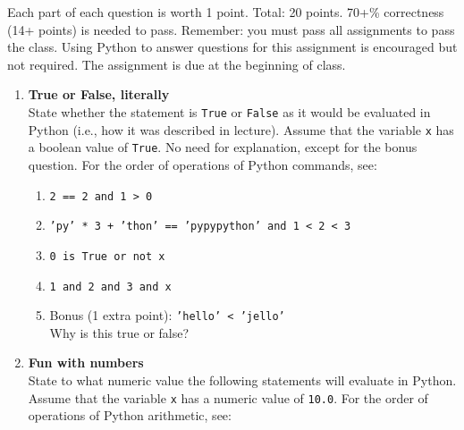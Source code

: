 \documentclass{article}
\newcounter{points}
\begin{document}
\pagestyle{fancy}

Each part of each question is worth 1 point.  Total: 20 points.  70+\% correctness (14+ points) is needed to pass.  Remember: you must pass all assignments to pass the class.  Using Python to answer questions for this assignment is encouraged but not required.  The assignment is due at the beginning of class.

\begin{enumerate}
\item \textbf{True or False, literally} \\
State whether the statement is \texttt{True} or \texttt{False} as it would be evaluated in Python (i.e., how it was described in lecture).  Assume that the variable \texttt{x} has a boolean value of \texttt{True}.  No need for explanation, except for the bonus question.  For the order of operations of Python commands, see: %

\begin{enumerate}
\item \texttt{2 == 2 and 1 > 0}
\end{enumerate}

\begin{enumerate}
\setcounter{enumii}{1}
\item \texttt{'py' * 3 + 'thon' == 'pypypython' and 1 < 2 < 3}
\end{enumerate}

\begin{enumerate}
\setcounter{enumii}{2}
\item \texttt{0 is True or not x}
\end{enumerate}

\begin{enumerate}
\setcounter{enumii}{3}
\item \texttt{1 and 2 and 3 and x}
\end{enumerate}

\begin{enumerate}
\setcounter{enumii}{4}
\item Bonus (1 extra point):  \texttt{'hello' < 'jello'}  \\
Why is this true or false?
\end{enumerate}


\item \textbf{Fun with numbers} \\
State to what numeric value the following statements will evaluate in Python.  Assume that the variable \texttt{x} has a numeric value of \texttt{10.0}.  For the order of operations of Python arithmetic, see: %


\end{enumerate}
\end{document}
